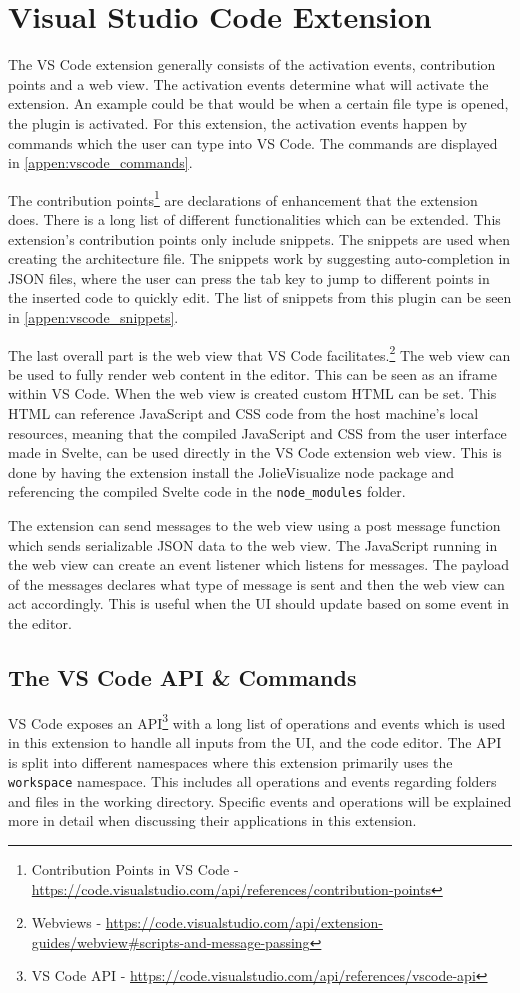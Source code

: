 \section{Visual Studio Code Extension}
The VS Code extension generally consists of the activation events, contribution points and a web view.
The activation events determine what will activate the extension. An example could be that would be when a certain file type is opened, the plugin is activated.
For this extension, the activation events happen by commands which the user can type into VS Code. The commands are displayed in \cref{appen:vscode_commands}.

The contribution points\footnote{Contribution Points in VS Code - \url{https://code.visualstudio.com/api/references/contribution-points}} are declarations of enhancement that the extension does. There is a long list of different functionalities which can be extended.
This extension's contribution points only include snippets. The snippets are used when creating the architecture file. The snippets work by suggesting auto-completion in JSON files, where the user can press the tab key to jump to different points in the inserted code to quickly edit.
The list of snippets from this plugin can be seen in \cref{appen:vscode_snippets}.

The last overall part is the web view that VS Code facilitates.\footnote{Webviews - \url{https://code.visualstudio.com/api/extension-guides/webview\#scripts-and-message-passing}} The web view can be used to fully render web content in the editor.
This can be seen as an iframe within VS Code. When the web view is created custom HTML can be set. This HTML can reference JavaScript and CSS code from the host machine's local resources, meaning that the compiled JavaScript and CSS from the user interface made in Svelte, can be used directly in the VS Code extension web view.
This is done by having the extension install the JolieVisualize node package and referencing the compiled Svelte code in the \texttt{node\_modules} folder.

The extension can send messages to the web view using a post message function which sends serializable JSON data to the web view.
The JavaScript running in the web view can create an event listener which listens for messages. The payload of the messages declares what type of message is sent and then the web view can act accordingly.
This is useful when the UI should update based on some event in the editor.

\subsection{The VS Code API \& Commands}
VS Code exposes an API\footnote{VS Code API - \url{https://code.visualstudio.com/api/references/vscode-api}} with a long list of operations and events
which is used in this extension to handle all inputs from the UI, and the code editor.
The API is split into different namespaces where this extension primarily uses the \texttt{workspace}
namespace. This includes all operations and events regarding folders and files in the working directory.
Specific events and operations will be explained more in detail when discussing their applications in this extension.

